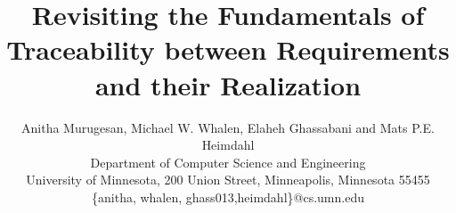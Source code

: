 \documentclass{IEEEtran}
\begin{document}
    \newcommand{\mike}[1]{\textcolor{green}{\emph {Mike: #1}}}
    \newcommand{\mats}[1]{\textcolor{blue}{\sc Mats: #1}}
    \newcommand{\sanjai}[1]{\textcolor{magenta}{\sc Sanjai: #1}}
    \newcommand{\anitha}[1]{\textcolor{red}{\emph {Anitha: #1}}}
    \newcommand{\req}[1]{\textcolor{blue}{\begin{quotation}\emph{#1}\end{quotation}}} %
    \newcommand{\eq}[1]{\textcolor{blue}{\begin{equation} #1\end{equation}}}
    \sloppypar


\title{Revisiting the Fundamentals of Traceability between Requirements and their Realization}

\author{Anitha Murugesan, Michael W. Whalen, Elaheh Ghassabani and Mats P.E. Heimdahl \\
      {Department of Computer Science and Engineering}\\
      {University of Minnesota, 200 Union Street, Minneapolis, Minnesota 55455}\\
      {\{anitha, whalen, ghass013,heimdahl\}@cs.umn.edu}
}

    \maketitle
\begin{abstract}

\end{abstract}
    
    
    
    
%    
%    
%    

%    
%    

%



\end{document}
